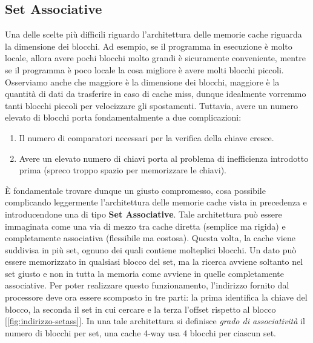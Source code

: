 \subsection{Set Associative}
\label{chap:set-ass}
Una delle scelte più difficili riguardo l'architettura delle memorie cache riguarda la dimensione dei blocchi. Ad esempio, se il programma in esecuzione è molto locale, allora avere pochi blocchi molto grandi è sicuramente conveniente, mentre se il programma è poco locale la cosa migliore è avere molti blocchi piccoli. Osserviamo anche che maggiore è la dimensione dei blocchi, maggiore è la quantità di dati da trasferire in caso di cache miss, dunque idealmente vorremmo tanti blocchi piccoli per velocizzare gli spostamenti. Tuttavia, avere un numero elevato di blocchi porta fondamentalmente a due complicazioni:
\begin{enumerate}
    \item Il numero di comparatori necessari per la verifica della chiave cresce.
    \item Avere un elevato numero di chiavi porta al problema di inefficienza introdotto prima (spreco troppo spazio per memorizzare le chiavi).
\end{enumerate}

\MakeUppercase{è} fondamentale trovare dunque un giusto compromesso, cosa possibile complicando leggermente l'architettura delle memorie cache vista in precedenza e introducendone una di tipo \textbf{Set Associative}. Tale architettura può essere immaginata come una via di mezzo tra cache diretta (semplice ma rigida) e completamente associativa (flessibile ma costosa). Questa volta, la cache viene suddivisa in più set, ognuno dei quali contiene molteplici blocchi. Un dato può essere memorizzato in qualsiasi blocco del set, ma la ricerca avviene soltanto nel set giusto e non in tutta la memoria come avviene in quelle completamente associative. Per poter realizzare questo funzionamento, l'indirizzo fornito dal processore deve ora essere scomposto in tre parti: la prima identifica la chiave del blocco, la seconda il set in cui cercare e la terza l'offset rispetto al blocco [\ref{fig:indirizzo-setass}]. In una tale architettura si definisce \textit{grado di associatività} il numero di blocchi per set, una cache 4-way usa 4 blocchi per ciascun set.

